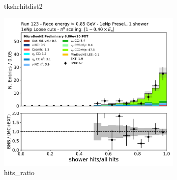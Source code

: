 \begin{figure}[H]
\begin{subfigure}{0.3\textwidth}
    \caption{tkshrhitdist2}
    \end{subfigure}
    \begin{subfigure}{0.3\textwidth}
    \includegraphics[width=1.0\textwidth]{Sidebands/Figures/1eNp/HighEnergy/HiEext_NPOneShr_NPL_pi0e040/hits_ratio.pdf}
    \caption{hits\_ratio}
    \end{subfigure}
    \caption{} 
    \label{fig:HE_1eNp_L_3}
\end{figure}

